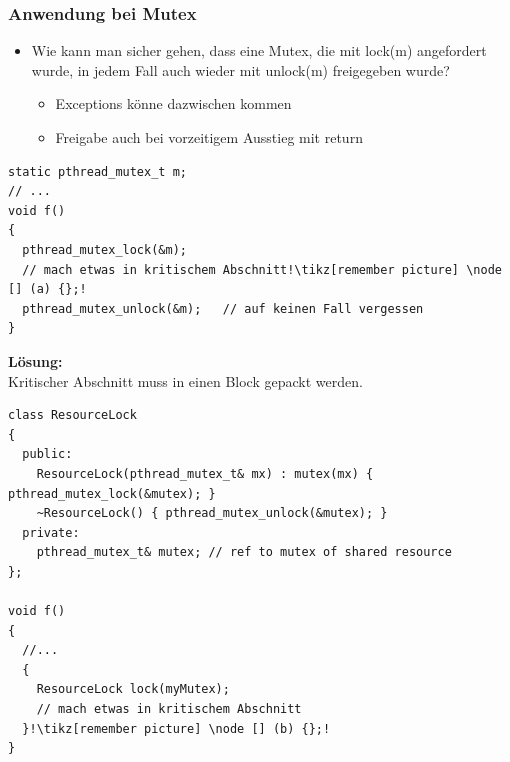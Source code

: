 \subsubsection{Anwendung bei Mutex}
\begin{itemize}
  \item Wie kann man sicher gehen, dass eine Mutex, die mit lock(m) angefordert wurde, in jedem Fall auch wieder mit unlock(m) freigegeben wurde?
  \begin{itemize}
    \item Exceptions könne dazwischen kommen
    \item Freigabe auch bei vorzeitigem Ausstieg mit return
  \end{itemize}
\end{itemize}
\begin{lstlisting}[style=C,escapechar=!]
static pthread_mutex_t m;
// ...
void f()
{
  pthread_mutex_lock(&m);
  // mach etwas in kritischem Abschnitt!\tikz[remember picture] \node [] (a) {};!
  pthread_mutex_unlock(&m);   // auf keinen Fall vergessen
}
\end{lstlisting}
\textbf{Lösung:}\\
Kritischer Abschnitt muss in einen Block gepackt werden.
\begin{lstlisting}[style=C,escapechar=!]
class ResourceLock
{
  public:
    ResourceLock(pthread_mutex_t& mx) : mutex(mx) { pthread_mutex_lock(&mutex); }
    ~ResourceLock() { pthread_mutex_unlock(&mutex); }
  private:
    pthread_mutex_t& mutex; // ref to mutex of shared resource
};

void f()
{
  //...
  {
    ResourceLock lock(myMutex);
    // mach etwas in kritischem Abschnitt
  }!\tikz[remember picture] \node [] (b) {};!
}
\end{lstlisting}



